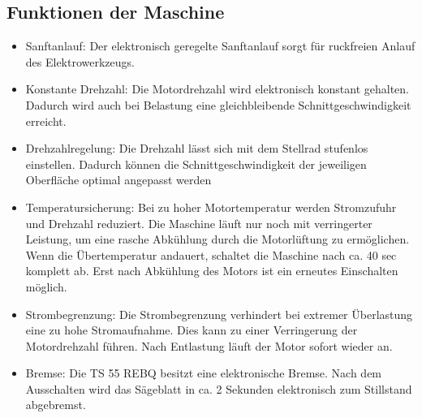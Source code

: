\documentclass{\basedir/fablab-document}
\begin{document}
\subsection{Funktionen der Maschine}
\begin{itemize}
\item Sanftanlauf: Der elektronisch geregelte Sanftanlauf sorgt für ruckfreien Anlauf des Elektrowerkzeugs.
\item Konstante Drehzahl: Die Motordrehzahl wird elektronisch konstant gehalten. Dadurch wird auch bei Belastung eine gleichbleibende Schnittgeschwindigkeit erreicht.
\item Drehzahlregelung: Die Drehzahl lässt sich mit dem Stellrad stufenlos einstellen. Dadurch können die Schnittgeschwindigkeit der jeweiligen Oberfläche optimal angepasst werden 
\item Temperatursicherung: Bei zu hoher Motortemperatur werden Stromzufuhr und Drehzahl reduziert. Die Maschine läuft nur noch mit verringerter Leistung, um eine rasche Abkühlung durch die Motorlüftung zu ermöglichen. Wenn die Übertemperatur andauert, schaltet die Maschine nach ca. 40 sec komplett ab. Erst nach Abkühlung des Motors ist ein erneutes Einschalten möglich.
\item Strombegrenzung: Die Strombegrenzung verhindert bei extremer Überlastung eine zu hohe Stromaufnahme. Dies kann zu einer Verringerung der Motordrehzahl führen. Nach Entlastung läuft der Motor sofort wieder an.
\item Bremse: Die TS 55 REBQ besitzt eine elektronische Bremse. Nach dem Ausschalten wird das Sägeblatt in ca. 2 Sekunden elektronisch zum Stillstand abgebremst.
\end{itemize}
\end{document}
